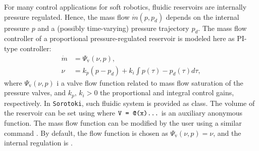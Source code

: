 For many control applications for soft robotics, fluidic reservoirs are internally pressure regulated. Hence, the mass flow $\dot{m}(p,p_d)$ depends on the internal pressure $p$ and a (possibly time-varying) pressure trajectory $p_d$. The mass flow controller of a proportional pressure-regulated reservoir is modeled here as PI-type controller:
%
\begin{align}
    \dot{m} & = \Psi_\textrm{v}(\nu,p),                            \\
    \nu     & = k_p(p - p_d) + k_i \int p(\tau) - p_d(\tau) d\tau,
\end{align}
%
where $\Psi_{\textrm{v}}(\nu,p)$ i a valve flow function related to mass flow saturation of the pressure valves, and $k_p,\,k_i >0$ the proportional and integral control gains, respectively. In \texttt{Sorotoki}, such fluidic system is provided as  class. The volume of the reservoir can be set using  where $\texttt{V = @(x)...}$ is an auxiliary anonymous function. The mass flow function can be modified by the user using a similar command . By default, the flow function is chosen as $\Psi_{\textrm{v}}(\nu,p) = \nu$, and the internal regulation is . \\


